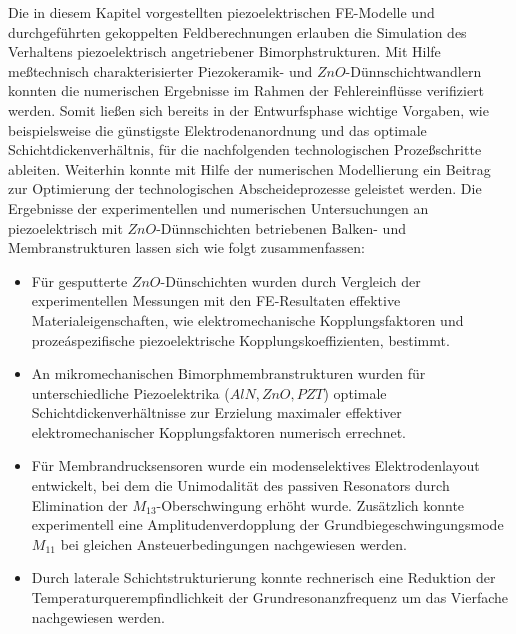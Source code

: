 Die in diesem Kapitel vorgestellten piezoelektrischen FE-Modelle und
durchgeführten gekoppelten Feldberechnungen erlauben die Simulation des
Verhaltens piezoelektrisch angetriebener Bimorphstrukturen. Mit Hilfe
meßtechnisch charakterisierter Piezokeramik- und $ZnO$-Dünnschichtwandlern
konnten die numerischen Ergebnisse im Rahmen der Fehlereinflüsse verifiziert
werden. Somit ließen sich bereits in der Entwurfsphase wichtige Vorgaben,
wie beispielsweise die günstigste Elektrodenanordnung und das optimale
Schichtdickenverhältnis, für die nachfolgenden technologischen
Prozeßschritte ableiten. Weiterhin konnte mit Hilfe der numerischen
Modellierung ein Beitrag zur Optimierung der technologischen
Abscheideprozesse geleistet werden.
Die Ergebnisse der experimentellen und numerischen Untersuchungen an
piezoelektrisch mit $ZnO$-Dünnschichten betriebenen Balken- und
Membranstrukturen lassen sich wie folgt zusammenfassen:
%
\begin{itemize}
\item
Für gesputterte $ZnO$-Dünschichten wurden durch Vergleich der
experimentellen Messungen mit den FE-Resultaten effektive
Materialeigenschaften, wie elektromechanische Kopplungsfaktoren und
prozeáspezifische piezoelektrische Kopplungskoeffizienten, bestimmt.
\item
An mikromechanischen Bimorphmembranstrukturen wurden für unterschiedliche
Piezoelektrika ($AlN, ZnO, PZT$) optimale Schichtdickenverhältnisse
zur Erzielung maximaler effektiver elektromechanischer Kopplungsfaktoren
numerisch errechnet.
\item
Für Membrandrucksensoren wurde ein modenselektives Elektrodenlayout
entwickelt, bei dem die Unimodalität des passiven Resonators durch
Elimination der $M_{13}$-Oberschwingung erhöht wurde. Zusätzlich konnte
experimentell eine Amplitudenverdopplung der Grundbiegeschwingungsmode
$M_{11}$ bei gleichen Ansteuerbedingungen nachgewiesen werden.
\item
Durch laterale Schichtstrukturierung konnte rechnerisch eine
Reduktion der Temperaturquerempfindlichkeit der Grundresonanzfrequenz
um das Vierfache nachgewiesen werden.
\end{itemize}
%
